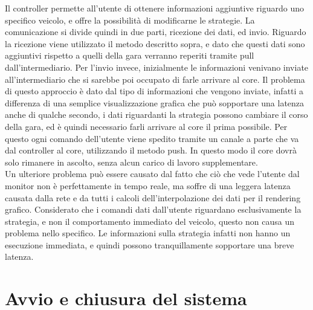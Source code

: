 Il controller permette all’utente di ottenere informazioni aggiuntive riguardo uno specifico veicolo, e offre la possibilità di modificarne le strategie.
La comunicazione si divide quindi in due parti, ricezione dei dati, ed invio.
Riguardo la ricezione viene utilizzato il metodo descritto sopra, e dato che questi dati sono aggiuntivi rispetto a quelli della gara verranno reperiti tramite pull dall’intermediario.
Per l’invio invece, inizialmente le informazioni venivano inviate all’intermediario che si sarebbe poi  occupato di farle arrivare al core. Il problema di questo approccio è dato dal tipo di informazioni che vengono inviate, infatti a differenza di una semplice visualizzazione grafica che può sopportare una latenza anche di qualche secondo, i dati riguardanti la strategia possono cambiare il corso della gara, ed è quindi necessario farli arrivare al core il prima possibile. %
Per questo ogni comando dell’utente viene spedito tramite un canale a parte che va dal controller al core, utilizzando il metodo push. In questo modo il core dovrà solo rimanere in ascolto, senza alcun carico di lavoro supplementare.  \\
Un ulteriore problema può essere causato dal fatto che ciò che vede l’utente dal monitor non è perfettamente in tempo reale, ma soffre di una leggera latenza causata dalla rete e da tutti i calcoli dell’interpolazione dei dati per il rendering grafico. Considerato che i comandi dati dall’utente riguardano esclusivamente la strategia, e non il comportamento immediato del veicolo, questo non causa un problema nello specifico. Le informazioni sulla strategia infatti non hanno un esecuzione immediata, e quindi possono tranquillamente sopportare una breve latenza.


\section{Avvio e chiusura del sistema}

